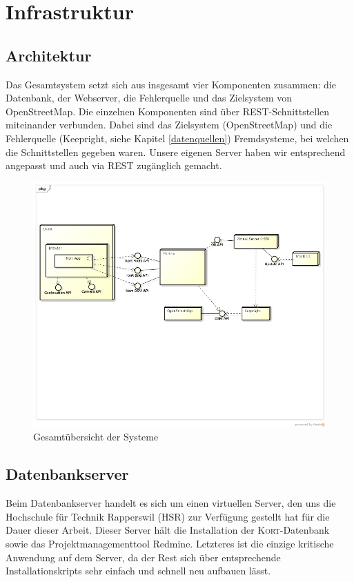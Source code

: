 \chapter{Infrastruktur}
\label{infrastruktur}

\section{Architektur}

Das Gesamtsystem setzt sich aus insgesamt vier Komponenten zusammen: die Datenbank, der Webserver, die Fehlerquelle und das Zielsystem von OpenStreetMap. 
Die einzelnen Komponenten sind über \gls{REST}-Schnittstellen miteinander verbunden. 
Dabei sind das Zielsystem (OpenStreetMap) und die Fehlerquelle (Keepright, siehe Kapitel \ref{datenquellen}) Fremdsysteme, bei welchen die Schnittstellen gegeben waren. 
Unsere eigenen Server haben wir entsprechend angepasst und auch via REST zugänglich gemacht.

\begin{figure}[H]
	\centering
	\includegraphics[width=\textwidth]{images/uml/deployment_diagram}
	\caption{Gesamtübersicht der Systeme}
	\label{deplyoyment-diagram}
\end{figure}


\section{Datenbankserver}

Beim Datenbankserver handelt es sich um einen virtuellen Server, den uns die Hochschule für Technik Rapperswil (HSR) zur Verfügung gestellt hat für die Dauer dieser Arbeit.
Dieser Server hält die Installation der \textsc{Kort}-Datenbank sowie das Projektmanagementtool Redmine.
Letzteres ist die einzige kritische Anwendung auf dem Server, da der Rest sich über entsprechende Installationskripts sehr einfach und schnell neu aufbauen lässt.

